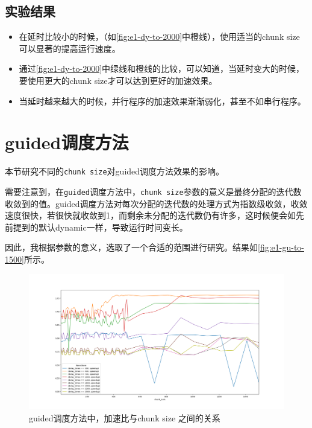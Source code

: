 \documentclass[forprint]{myreport}
\begin{document}
\subsection{实验结果}

\begin{itemize}
    \item 在延时比较小的时候，（如\autoref{fig:e1-dy-to-2000}中橙线），使用适当的chunk size 可以显著的提高运行速度。
    \item 通过\autoref{fig:e1-dy-to-2000}中绿线和橙线的比较，可以知道，当延时变大的时候，要使用更大的chunk size才可以达到更好的加速效果。
    \item 当延时越来越大的时候，并行程序的加速效果渐渐弱化，甚至不如串行程序。
\end{itemize}

\section{guided调度方法}

本节研究不同的\texttt{chunk size}对guided调度方法效果的影响。

需要注意到，在\texttt{guided}调度方法中，\texttt{chunk size}参数的意义是最终分配的迭代数收敛到的值。guided调度方法对每次分配的迭代数的处理方式为指数级收敛，收敛速度很快，若很快就收敛到1，而剩余未分配的迭代数仍有许多，这时候便会如先前提到的默认dynamic一样，导致运行时间变长。

因此，我根据参数的意义，选取了一个合适的范围进行研究。结果如\autoref{fig:e1-gu-to-1500}所示。

\begin{figure}[htp]
    \centering
    \includegraphics[width=15cm]{"../HW3-1/figure/guided_chunk_num1-1500.png"}
    \caption{guided调度方法中，加速比与chunk size 之间的关系}
    \label{fig:e1-gu-to-1500}
\end{figure}
\end{document}
